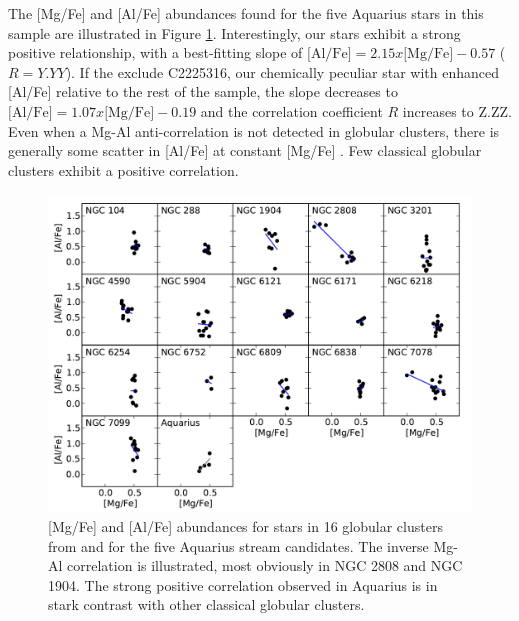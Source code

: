 \documentclass{emulateapj}
\begin{document}
The [Mg/Fe] and [Al/Fe] abundances found for the five Aquarius stars in this sample are illustrated in Figure \ref{fig:mg-al}. Interestingly, our stars exhibit a strong positive relationship, with a best-fitting slope of $\mbox{[Al/Fe]} = 2.15 x \mbox{[Mg/Fe]} - 0.57$ ($R = Y.YY$). If the exclude C2225316, our chemically peculiar star with enhanced [Al/Fe] relative to the rest of the sample, the slope decreases to $\mbox{[Al/Fe]} = 1.07 x \mbox{[Mg/Fe]} - 0.19$ and the correlation coefficient $R$ increases to Z.ZZ. Even when a Mg-Al anti-correlation is not detected in globular clusters, there is generally some scatter in [Al/Fe] at constant [Mg/Fe] \citet[e.g. see][]{carretta;et-al_2009a}. Few classical globular clusters exhibit a positive correlation.

\begin{figure}[t!]
	\includegraphics[width=\textwidth]{./figures/aquarius-mg-al-cluster.pdf}
	\caption{[Mg/Fe] and [Al/Fe] abundances for stars in 16 globular clusters from \citet{carretta;et-al_2009} and for the five Aquarius stream candidates. The inverse Mg-Al correlation is illustrated, most obviously in NGC 2808 and NGC 1904. The strong positive correlation observed in Aquarius is in stark contrast with other classical globular clusters.}
	\label{fig:mg-al}
\end{figure}
\end{document}
